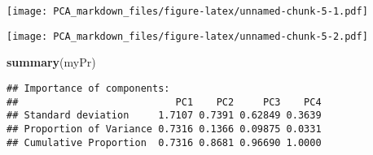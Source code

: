 \documentclass[]{article}
\newenvironment{Shaded}{\begin{snugshade}}{\end{snugshade}}
\newcommand{\DataTypeTok}[1]{\textcolor[rgb]{0.13,0.29,0.53}{#1}}
\newcommand{\DecValTok}[1]{\textcolor[rgb]{0.00,0.00,0.81}{#1}}
\newcommand{\KeywordTok}[1]{\textcolor[rgb]{0.13,0.29,0.53}{\textbf{#1}}}
\newcommand{\NormalTok}[1]{#1}
\newcommand{\OperatorTok}[1]{\textcolor[rgb]{0.81,0.36,0.00}{\textbf{#1}}}
\newcommand{\StringTok}[1]{\textcolor[rgb]{0.31,0.60,0.02}{#1}}
\begin{document}
\texttt{[image: PCA\_markdown\_files/figure-latex/unnamed-chunk-5-1.pdf]}

\begin{Shaded}
\end{Shaded}

\texttt{[image: PCA\_markdown\_files/figure-latex/unnamed-chunk-5-2.pdf]}

\begin{Shaded}
\begin{Highlighting}[]
\KeywordTok{summary}\NormalTok{(myPr)}
\end{Highlighting}
\end{Shaded}

\begin{verbatim}
## Importance of components:
##                           PC1    PC2     PC3    PC4
## Standard deviation     1.7107 0.7391 0.62849 0.3639
## Proportion of Variance 0.7316 0.1366 0.09875 0.0331
## Cumulative Proportion  0.7316 0.8681 0.96690 1.0000
\end{verbatim}
\end{document}
